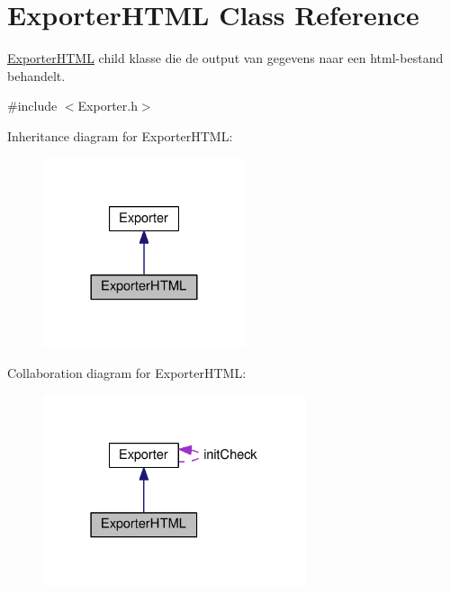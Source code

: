 \hypertarget{class_exporter_h_t_m_l}{}\section{Exporter\+H\+T\+ML Class Reference}
\label{class_exporter_h_t_m_l}


\hyperlink{class_exporter_h_t_m_l}{Exporter\+H\+T\+ML} child klasse die de output van gegevens naar een html-\/bestand behandelt.  




{\ttfamily \#include $<$Exporter.\+h$>$}



Inheritance diagram for Exporter\+H\+T\+ML\+:
\nopagebreak
\begin{figure}[H]
\begin{center}
\leavevmode
\includegraphics[width=168pt]{class_exporter_h_t_m_l__inherit__graph}
\end{center}
\end{figure}


Collaboration diagram for Exporter\+H\+T\+ML\+:
\nopagebreak
\begin{figure}[H]
\begin{center}
\leavevmode
\includegraphics[width=219pt]{class_exporter_h_t_m_l__coll__graph}
\end{center}
\end{figure}
